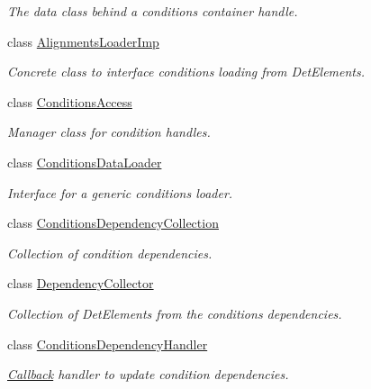 \begin{DoxyCompactItemize}
\begin{DoxyCompactList}\small\item\em The data class behind a conditions container handle. \item\end{DoxyCompactList}\item 
class \hyperlink{class_d_d4hep_1_1_conditions_1_1_alignments_loader_imp}{AlignmentsLoaderImp}
\begin{DoxyCompactList}\small\item\em Concrete class to interface conditions loading from DetElements. \item\end{DoxyCompactList}\item 
class \hyperlink{class_d_d4hep_1_1_conditions_1_1_conditions_access}{ConditionsAccess}
\begin{DoxyCompactList}\small\item\em Manager class for condition handles. \item\end{DoxyCompactList}\item 
class \hyperlink{class_d_d4hep_1_1_conditions_1_1_conditions_data_loader}{ConditionsDataLoader}
\begin{DoxyCompactList}\small\item\em Interface for a generic conditions loader. \item\end{DoxyCompactList}\item 
class \hyperlink{class_d_d4hep_1_1_conditions_1_1_conditions_dependency_collection}{ConditionsDependencyCollection}
\begin{DoxyCompactList}\small\item\em Collection of condition dependencies. \item\end{DoxyCompactList}\item 
class \hyperlink{class_d_d4hep_1_1_conditions_1_1_dependency_collector}{DependencyCollector}
\begin{DoxyCompactList}\small\item\em Collection of DetElements from the conditions dependencies. \item\end{DoxyCompactList}\item 
class \hyperlink{class_d_d4hep_1_1_conditions_1_1_conditions_dependency_handler}{ConditionsDependencyHandler}
\begin{DoxyCompactList}\small\item\em \hyperlink{class_d_d4hep_1_1_callback}{Callback} handler to update condition dependencies. \item\end{DoxyCompactList}\item 

\end{DoxyCompactItemize}
